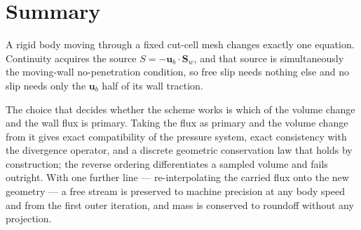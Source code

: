 \documentclass[11pt,a4paper]{article}
\theoremstyle{remark}
\newcommand{\uu}{\bm{u}}
\newcommand{\Sw}{\bm{S}_w}
\newcommand{\ub}{\uu_b}
\begin{document}
\section{Summary}

A rigid body moving through a fixed cut-cell mesh changes exactly one equation. Continuity
acquires the source $S=-\ub\!\cdot\!\Sw$, and that source is simultaneously the moving-wall
no-penetration condition, so free slip needs nothing else and no slip needs only the $\ub$ half
of its wall traction.

The choice that decides whether the scheme works is which of the volume change and the wall flux
is primary. Taking the flux as primary and the volume change from it gives exact compatibility of
the pressure system, exact consistency with the divergence operator, and a discrete geometric
conservation law that holds by construction; the reverse ordering differentiates a sampled
volume and fails outright. With one further line --- re-interpolating the carried flux onto the
new geometry --- a free stream is preserved to machine precision at any body speed and from the
first outer iteration, and mass is conserved to roundoff without any projection.
\end{document}
